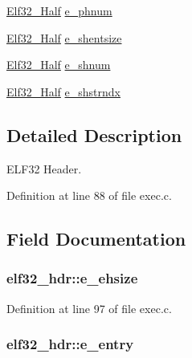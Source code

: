 \begin{DoxyCompactItemize}
\item 
\hyperlink{exec_8c_a2ff0787d7d1bae0f251192806a2974ca}{Elf32\+\_\+\+Half} \hyperlink{structelf32__hdr_ae97c82a1bab1e0bf6de2d4ad0f6eef79}{e\+\_\+phnum}
\item 
\hyperlink{exec_8c_a2ff0787d7d1bae0f251192806a2974ca}{Elf32\+\_\+\+Half} \hyperlink{structelf32__hdr_a8ca2eaada4cff245f41faa852a4a248e}{e\+\_\+shentsize}
\item 
\hyperlink{exec_8c_a2ff0787d7d1bae0f251192806a2974ca}{Elf32\+\_\+\+Half} \hyperlink{structelf32__hdr_ab7d153e79bf2dca73049268f1fcd79c6}{e\+\_\+shnum}
\item 
\hyperlink{exec_8c_a2ff0787d7d1bae0f251192806a2974ca}{Elf32\+\_\+\+Half} \hyperlink{structelf32__hdr_afd7ed18333923147918975fdfa4ee99a}{e\+\_\+shstrndx}
\end{DoxyCompactItemize}


\subsection{Detailed Description}
E\+L\+F32 Header. 

Definition at line 88 of file exec.\+c.



\subsection{Field Documentation}
\hypertarget{structelf32__hdr_a3d3364b74b882c7383f11a17ddda34b2}{
\subsubsection[{e\+\_\+ehsize}]{ elf32\+\_\+hdr\+::e\+\_\+ehsize}}\label{structelf32__hdr_a3d3364b74b882c7383f11a17ddda34b2}


Definition at line 97 of file exec.\+c.

\hypertarget{structelf32__hdr_aebf266c7454956ac9aca091c837f6c14}{
\subsubsection[{e\+\_\+entry}]{ elf32\+\_\+hdr\+::e\+\_\+entry}}\label{structelf32__hdr_aebf266c7454956ac9aca091c837f6c14}


